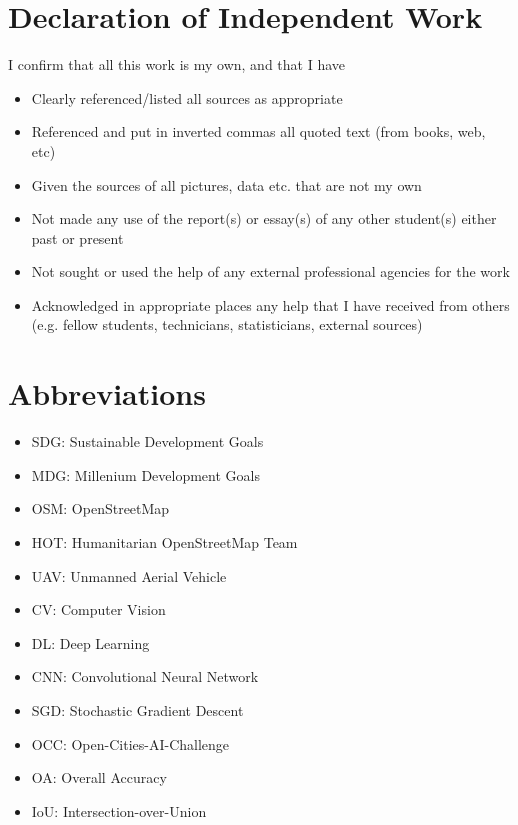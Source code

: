 \documentclass[11pt, a4paper, twoside]{report}
\begin{document}
\newpage
\section{Declaration of Independent Work}

I confirm that all this work is my own, and that I have
\begin{itemize}
  \item Clearly referenced/listed all sources as appropriate
  \item Referenced and put in inverted commas all quoted text (from books, web, etc)
  \item Given the sources of all pictures, data etc. that are not my own
  \item Not made any use of the report(s) or essay(s) of any other student(s) either past or present
  \item Not sought or used the help of any external professional agencies for the work
  \item Acknowledged in appropriate places any help that I have received from others (e.g. fellow students, technicians, statisticians, external sources)
\end{itemize}

\newpage


\tableofcontents

\newpage

\listoffigures

\newpage

\listoftables
\clearpage

\newpage
\pagestyle{plain}
\section{Abbreviations}

\begin{itemize}
  \item SDG: Sustainable Development Goals
  \item MDG: Millenium Development Goals
  \item OSM: OpenStreetMap
  \item HOT: Humanitarian OpenStreetMap Team
  \item UAV: Unmanned Aerial Vehicle
  \item CV: Computer Vision
  \item DL: Deep Learning
  \item CNN: Convolutional Neural Network
  \item SGD: Stochastic Gradient Descent
  \item OCC: Open-Cities-AI-Challenge
  \item OA: Overall Accuracy
  \item IoU: Intersection-over-Union
\end{itemize}
\end{document}
